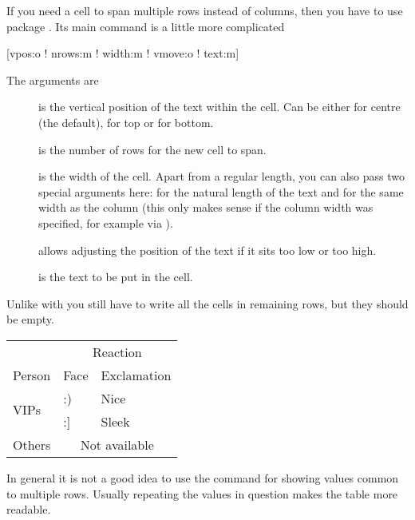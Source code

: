 If you need a cell to span multiple rows instead of columns, then you have to
use package . Its main command is a little more complicated
\begin{lscommand}
  [vpos:o ! nrows:m ! width:m ! vmove:o ! text:m]
\end{lscommand}
The arguments are
\begin{description}
  \item[] is the vertical position of the text within the cell.
    Can be either  for centre (the default),  for top or
     for bottom.
  \item[] is the number of rows for the new cell to span.
  \item[] is the width of the cell. Apart from a regular length,
    you can also pass two special arguments here: \cargv{*} for the natural
    length of the text and \cargv{=} for the same width as the column (this
    only makes sense if the column width was specified, for example via
    ).
  \item[] allows adjusting the position of the text if it sits too
    low or too high.
  \item[] is the text to be put in the cell.
\end{description}
Unlike with  you still have to write all the cells in remaining
rows, but they should be empty.
\begin{chktexignore}
  \begin{example}[examplewidth=0.4\linewidth]
\begin{tabular}{@{}lll@{}}
  \toprule
                & \multicolumn{2}{c}{
                    Reaction}        \\
  \cmidrule(l){2-3}
  Person        & Face & Exclamation \\
  \midrule
  \multirow[t]{
    2}{*}{VIPs} & :)   & Nice        \\
                & :]   & Sleek       \\
  Others        & \multicolumn{2}{c}{
                    Not available}   \\
  \bottomrule
\end{tabular}
\end{example}
\end{chktexignore}

In general it is not a good idea to use the  command for showing
values common to multiple rows. Usually repeating the values in question makes
the table more readable.

